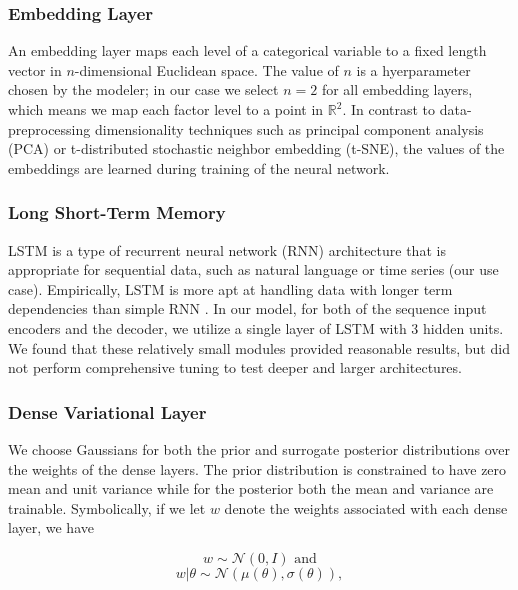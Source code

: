 \documentclass{article}
\begin{document}
\subsubsection{Embedding Layer}

An embedding layer maps each level of a categorical variable to a fixed length 
vector in $n$-dimensional Euclidean space. The value of $n$ is a hyerparameter 
chosen by the modeler; in our case we select $n = 2$ for all embedding layers, 
which means we map each factor level to a point in $\mathbb{R}^2$. In contrast 
to data-preprocessing dimensionality techniques such as principal component 
analysis (PCA) or t-distributed stochastic neighbor embedding (t-SNE), the 
values of the embeddings are learned during training of the neural network.

\subsubsection{Long Short-Term Memory}

LSTM is a type of recurrent neural network (RNN) architecture that is 
appropriate for sequential data, such as natural language or time series (our 
use case). Empirically, LSTM is more apt at handling data with longer term 
dependencies than simple RNN \cite{lecunDeepLearning2015}. In our model, for 
both of the sequence input encoders and the decoder, we utilize a single layer 
of LSTM with 3 hidden units. We found that these relatively small modules 
provided reasonable results, but did not perform comprehensive tuning to test
deeper and larger architectures. 

\subsubsection{Dense Variational Layer}

We choose Gaussians for both the prior and surrogate posterior distributions 
over the weights of the dense layers. The prior distribution is constrained to 
have zero mean and unit variance while for the posterior both the mean and
variance are trainable. Symbolically, if we let $w$ denote the weights 
associated with each dense layer, we have

\begin{equation}
    w \sim \mathcal{N}(0, I) \text{ and}
\end{equation}
\begin{equation}
    w|\theta \sim \mathcal{N}(\mu(\theta), \sigma(\theta)),
\end{equation}
\end{document}
